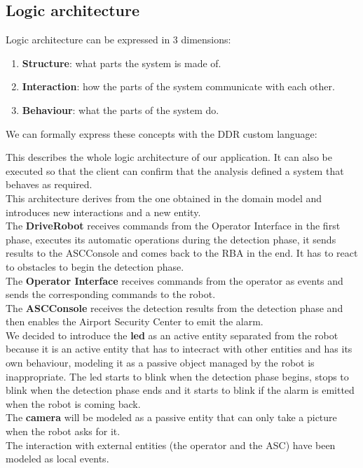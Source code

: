 \documentclass{llncs}
\begin{document}
\subsection{Logic architecture}
Logic architecture can be expressed in 3 dimensions:
\begin{enumerate}
\item \textbf{Structure}: what parts the system is made of.
\item \textbf{Interaction}: how the parts of the system communicate with each other.
\item \textbf{Behaviour}: what the parts of the system do.
\end{enumerate}
We can formally express these concepts with the DDR custom language:

This describes the whole logic architecture of our application. It can also be executed so that the client can confirm that the analysis defined a system that behaves as required.\\
This architecture derives from the one obtained in the domain model and introduces new interactions and a new entity.\\
The \textbf{DriveRobot} receives commands from the Operator Interface in the first phase, executes its automatic operations during the detection phase, it sends results to the ASCConsole and comes back to the RBA in the end. It has to react to obstacles to begin the detection phase.\\
The \textbf{Operator Interface} receives commands from the operator as events and sends the corresponding commands to the robot.\\
The \textbf{ASCConsole} receives the detection results from the detection phase and then enables the Airport Security Center to emit the alarm.\\
We decided to introduce the \textbf{led} as an active entity separated from the robot because it is an active entity that has to intecract with other entities and has its own behaviour, modeling it as a passive object managed by the robot is inappropriate. The led starts to blink when the detection phase begins, stops to blink when the detection phase ends and it starts to blink if the alarm is emitted when the robot is coming back.\\
The \textbf{camera} will be modeled as a passive entity that can only take a picture when the robot asks for it.\\
The interaction with external entities (the operator and the ASC) have been modeled as local events.
\end{document}
